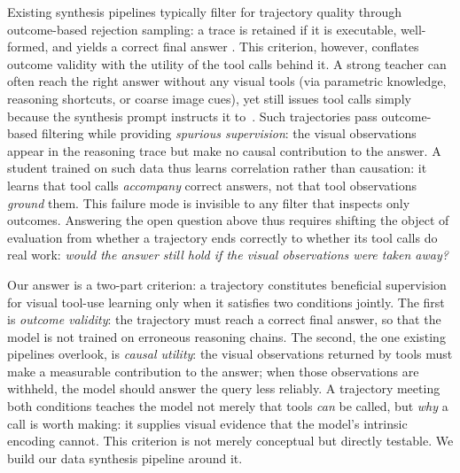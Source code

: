 Existing synthesis pipelines typically filter for trajectory quality through outcome-based rejection sampling: a trace is retained if it is executable, well-formed, and yields a correct final answer \citep{lai2026minio3,guo2025codevision}.
This criterion, however, conflates outcome validity with the utility of the tool calls behind it. 
A strong teacher can often reach the right answer without any visual tools (via parametric knowledge, reasoning shortcuts, or coarse image cues), yet still issues tool calls simply because the synthesis prompt instructs it to~\citep{hou2025codev,zhao2026focus}.
Such trajectories pass outcome-based filtering while providing \textit{spurious supervision}: the visual observations appear in the reasoning trace but make no causal contribution to the answer. 
A student trained on such data thus learns correlation rather than causation: it learns that tool calls \textit{accompany} correct answers, not that tool observations \textit{ground} them.
This failure mode is invisible to any filter that inspects only outcomes. Answering the open question above thus requires shifting the object of evaluation from whether a trajectory ends correctly to whether its tool calls do real work: \textit{would the answer still hold if the visual observations were taken away?}


Our answer is a two-part criterion: a trajectory constitutes beneficial supervision for visual tool-use learning only when it satisfies two conditions jointly. 
The first is \textit{outcome validity}: the trajectory must reach a correct final answer, so that the model is not trained on erroneous reasoning chains. 
The second, the one existing pipelines overlook, is \textit{causal utility}: the visual observations returned by tools must make a measurable contribution to the answer; when those observations are withheld, the model should answer the query less reliably.
A trajectory meeting both conditions teaches the model not merely that tools \textit{can} be called, but \textit{why} a call is worth making: it supplies visual evidence that the model's intrinsic encoding cannot.
This criterion is not merely conceptual but directly testable. We build our data synthesis pipeline around it.

